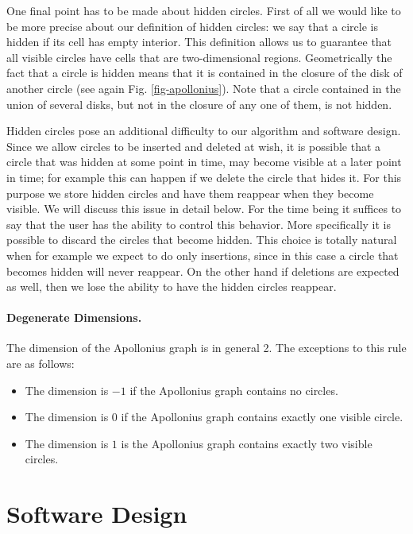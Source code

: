 One final point has to be made about hidden circles. First of all we
would like to be more precise about our definition of hidden circles:
we say that a circle is hidden if its cell has empty interior. This
definition allows us to guarantee that all visible circles have
cells that are two-dimensional regions.
Geometrically the fact that a circle is hidden means that it is
contained in the closure of the disk of another circle (see again
Fig. \ref{fig-apollonius}). Note that a circle contained in the union
of several disks, but not in the closure of any one of them, is not
hidden. 

Hidden circles pose an additional
difficulty to our algorithm and software design. Since we allow
circles to be inserted and deleted at wish, it is possible that a
circle that was hidden at some point in time, may become visible at
a later point in time; for example this can happen if we delete the
circle that hides it. For this purpose we store hidden circles and
have them reappear when they become visible. We will discuss this
issue in detail below. For the time being it suffices to say that the
user has the ability to control this behavior. More specifically it is
possible to discard the circles that become hidden. This choice is
totally natural when for example we expect to do only insertions,
since in this case a circle that becomes hidden will never
reappear. On the other hand if deletions are expected as well, then we
lose the ability to have the hidden circles reappear.

\paragraph{Degenerate Dimensions.}
The dimension of the Apollonius graph is in general 2. The exceptions
to this rule are as follows:
\begin{itemize}
\item The dimension is $-1$ if the Apollonius graph contains no circles.
\item The dimension is $0$ if the Apollonius graph contains exactly
  one visible circle.
\item The dimension is $1$ is the Apollonius graph contains exactly
  two visible circles.
\end{itemize}


\section{Software Design\label{sec:apollonius2-design}}


